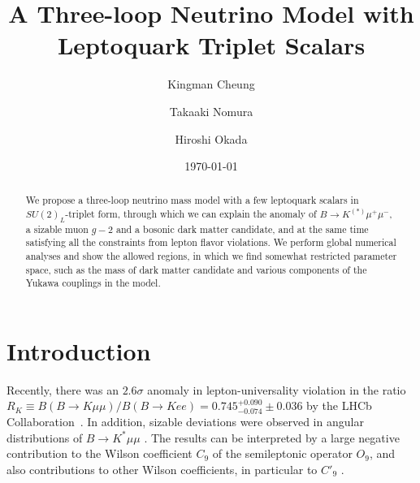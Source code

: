 \documentclass[%
showkeys,12pt,
preprint,preprintnumbers,nofootinbib,
groupedaddress,superscriptaddress,amsmath,amssymb]{revtex4}
\numberwithin{equation}{section}
\begin{document}
\title{A Three-loop Neutrino Model with Leptoquark Triplet Scalars}
%
\author{Kingman Cheung}


\author{Takaaki Nomura}


\author{Hiroshi Okada}


\date{\today}


\begin{abstract}
We propose a three-loop neutrino mass model with a few leptoquark scalars 
in $SU(2)_L$-triplet form, through which we can explain the anomaly 
of $B\to K^{(*)} \mu^+\mu^-$, a sizable muon $g-2$ and a bosonic dark matter 
candidate, and at the same time satisfying all the constraints 
from lepton flavor violations.
%
We perform global numerical analyses and show the allowed regions, 
in which we find somewhat restricted parameter space, such as 
the mass of dark matter candidate and various components of the 
Yukawa couplings in the model.
 \end{abstract}
\maketitle


\section{Introduction}

Recently, there was an $2.6\sigma$ anomaly in lepton-universality violation
in the ratio 
$R_K \equiv B(B\to K\mu\mu)/B(B\to K ee) = 0.745 ^{+0.090}_{-0.074} \pm 0.036$ 
by the LHCb Collaboration~\cite{lhcb-2014}. In addition, sizable 
deviations were observed in angular distributions of 
$B \to K^*\mu\mu$ \cite{lhcb-2013}.
The results can be interpreted by a large negative
contribution to the Wilson coefficient $C_9$ of the semileptonic operator
$O_9$, and also contributions to other Wilson coefficients, in particular to 
$C'_9$ \cite{Descotes-Genon:2015uva, Hiller:2014yaa, Hiller:2016kry, Descotes-Genon:2013wba}.
\end{document}
